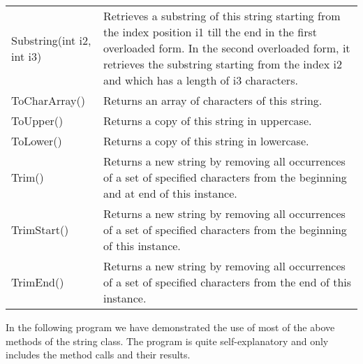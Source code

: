 \begin{center}
\begin{tabular}{ | m{5em} | m{10cm} | }
    Substring(int i2, int i3) &
    Retrieves a substring of this string starting from the index position i1 till the end
    in the first overloaded form. In the second overloaded form, it retrieves the
    substring starting from the index i2 and which has a length of i3 characters.\\
    ToCharArray() & Returns an array of characters of this string.\\
    ToUpper() & Returns a copy of this string in uppercase.\\
    ToLower() & Returns a copy of this string in lowercase.\\
    Trim() & Returns a new string by removing all occurrences of a set of specified characters
    from the beginning and at end of this instance.\\
    TrimStart() & Returns a new string by removing all occurrences of a set of specified characters
    from the beginning of this instance.\\
    TrimEnd() & Returns a new string by removing all occurrences of a set of specified characters
    from the end of this instance.\\
    \hline
    \end{tabular}
\end{center}


In the following program we have demonstrated the use of most of the above methods of the string class. The
program is quite self-explanatory and only includes the method calls and their results.

